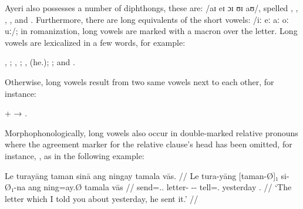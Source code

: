 Ayeri also possesses a number of diphthongs, these are: 
/aɪ eɪ ɔɪ ʊɪ aʊ/, spelled , , , , and 
. Furthermore, there are long equivalents of the short vowels: /iː eː 
aː oː uː/; in romanization, long vowels are marked with a macron 
 over the letter. Long vowels are lexicalized in a few words, for 
example:

\pex
	\a {}, 
		;
	\a {}, 
		;
	\a {},
		 (he.\Aarg{});\label{ex:laa}
	\a {}; and 
	\a {}.\footnotemark
\xe


\noindent Otherwise, long vowels result from two same vowels next to each other, 
for instance:

\ex
	 +  → 
	.\label{ex:longvwls}
\xe

\label{doublerel}
Morphophonologically, long vowels also occur in double-marked relative 
pronouns where the agreement 
marker for the relative clause's head has been omitted, for instance, 
, as in the following 
example:

\ex\begingl
	\gla Le turayāng taman sinā ang ningay tamala vās. //
	\glb Le tura-yāng [taman-Ø]₁ si-Ø₁-na ang ning=ay.Ø 
		tamala vās //
	\glc \PatTI{} send=\Tsg{}.\M{}.\Aarg{} letter-\Top{} 
		\Rel{}-\PatTI{}-\Gen{} \AgtT{} tell=\Fsg{}.\Top{} yesterday 
		\Ssg{}.\Parg{} //
	\glft `The letter which I told you about yesterday, he sent it.' //
\endgl\xe

